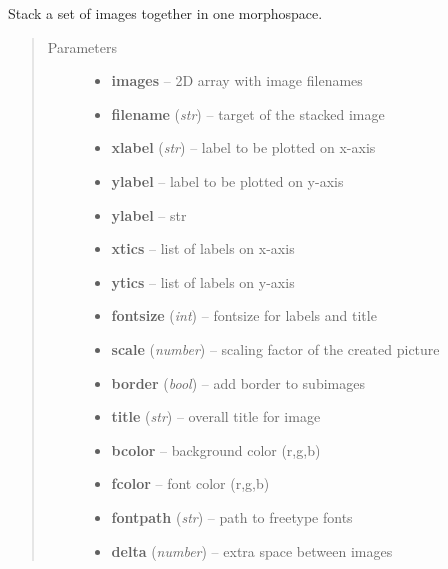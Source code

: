 \documentclass[letterpaper,10pt,english]{sphinxmanual}
\begin{document}
\begin{fulllineitems}
\label{ImageUtils:ImageUtils.morphImages}
Stack a set of images together in one morphospace.
\begin{quote}\begin{description}
\item[{Parameters}] \leavevmode\begin{itemize}
\item {} 
\textbf{images} -- 2D array with image filenames

\item {} 
\textbf{filename} (\emph{str}) -- target of the stacked image

\item {} 
\textbf{xlabel} (\emph{str}) -- label to be plotted on x-axis

\item {} 
\textbf{ylabel} -- label to be plotted on y-axis

\item {} 
\textbf{ylabel} -- str

\item {} 
\textbf{xtics} -- list of labels on x-axis

\item {} 
\textbf{ytics} -- list of labels on y-axis

\item {} 
\textbf{fontsize} (\emph{int}) -- fontsize for labels and title

\item {} 
\textbf{scale} (\emph{number}) -- scaling factor of the created picture

\item {} 
\textbf{border} (\emph{bool}) -- add border to subimages

\item {} 
\textbf{title} (\emph{str}) -- overall title for image

\item {} 
\textbf{bcolor} -- background color (r,g,b)

\item {} 
\textbf{fcolor} -- font color (r,g,b)

\item {} 
\textbf{fontpath} (\emph{str}) -- path to freetype fonts

\item {} 
\textbf{delta} (\emph{number}) -- extra space between images

\end{itemize}

\end{description}\end{quote}

\end{fulllineitems}
\end{document}
